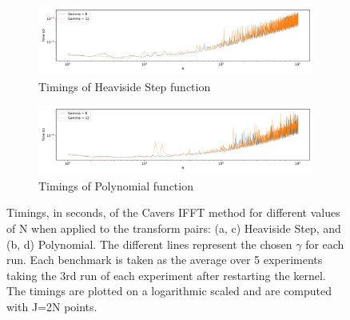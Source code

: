 \documentclass[a4paper]{report}
\begin{document}
\begin{figure}[H]
    \begin{subfigure}{1\linewidth}
      \includegraphics[width=\linewidth]{images/cavers/heaviside_log_speeds.png}
      \caption{Timings of Heaviside Step function}
    \end{subfigure}
    
    \medskip
    
    \begin{subfigure}{1\linewidth}
      \includegraphics[width=\linewidth]{images/cavers/polynomial_log_speeds.png}
      \caption{Timings of Polynomial function}
    \end{subfigure}
    
    \caption{Timings, in seconds, of the Cavers IFFT method for different values of N when applied to the transform pairs: (a, c) Heaviside Step, and (b, d) Polynomial. The different lines represent the chosen $\gamma$ for each run. Each benchmark is taken as the average over 5 experiments taking the 3rd run of each experiment after restarting the kernel. The timings are plotted on a logarithmic scaled and are computed with J=2N points.}
    \label{fig:timings_cavers_log}
\end{figure}
\end{document}
